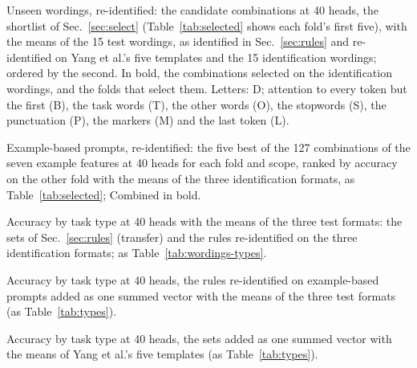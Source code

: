 \documentclass[10pt,a4paper]{article}
\begin{document}
\begin{table}[H]
\centering\small

\caption{Unseen wordings, re-identified: the candidate combinations at 40 heads, the shortlist of Sec.~\ref{sec:select} (Table~\ref{tab:selected} shows each fold's first five), with the means of the 15 test wordings, as identified in Sec.~\ref{sec:rules} and re-identified on Yang et al.'s five templates and the 15 identification wordings; ordered by the second. In bold, the combinations selected on the identification wordings, and the folds that select them. Letters: D; attention to every token but the first (B), the task words (T), the other words (O), the stopwords (S), the punctuation (P), the markers (M) and the last token (L).}
\label{tab:wordings-candidates}
\end{table}

\begin{table}[H]
\centering\footnotesize

\caption{Example-based prompts, re-identified: the five best of the 127 combinations of the seven example features at 40 heads for each fold and scope, ranked by accuracy on the other fold with the means of the three identification formats, as Table~\ref{tab:selected}; Combined in bold.}
\label{tab:examples-selected}
\end{table}

\begin{table}[H]
\centering\small

\caption{Accuracy by task type at 40 heads with the means of the three test formats: the sets of Sec.~\ref{sec:rules} (transfer) and the rules re-identified on the three identification formats; as Table~\ref{tab:wordings-types}.}
\label{tab:examples-types}
\end{table}

\begin{table}[H]
\centering\small

\caption{Accuracy by task type at 40 heads, the rules re-identified on example-based prompts added as one summed vector with the means of the three test formats (as Table~\ref{tab:types}).}
\label{tab:summed-examples-types}
\end{table}

\begin{table}[H]
\centering\small

\caption{Accuracy by task type at 40 heads, the sets added as one summed vector with the means of Yang et al.'s five templates (as Table~\ref{tab:types}).}
\label{tab:summed-types}
\end{table}
\end{document}
